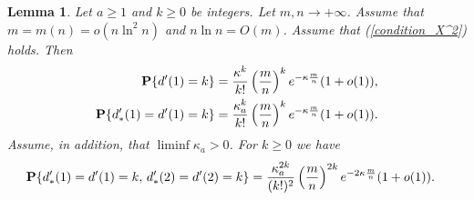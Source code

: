 \documentclass[11pt, a4paper]{article}
\newcommand{\PP}{{\bf{P}}}
\newtheorem{lem}{Lemma}
\begin{document}
\begin{lem}\label{AB+} 
Let $a\ge 1$ and $k\ge 0$ be integers.
Let $m,n\to+\infty$.
 Assume that $m=m(n)=o(n\ln^2n)$ and $n\ln n=O(m)$.  Assume that (\ref{condition_X^2}) holds. Then
 \begin{align}
  \label{2025-09-04}
 \PP\{d'(1)=k\}
 &
 =
 \frac{\kappa^k}{k!}\left(\frac{m}{n}\right)^k e^{-\kappa\frac{m}{n}}
 (1+o(1)),
 \\
 \label{2025-06-21_6+r+r}
 \PP\{d_*'(1)=d'(1)=k\}
 &
 =
 \frac{\kappa_a^k}{k!}
 \left(\frac{m}{n}\right)^k
  e^{-\kappa\frac{m}{n}}
 (1+o(1)).
 \end{align}
 Assume, in addition, that $\liminf\kappa_a>0$.
 For $k\ge 0$ we have 
 \begin{align}
  \label{2025-6-21_9+r}
 \PP\{d_*'(1)=d'(1)=k,\, d_*'(2)=d'(2)=k\}
& =\frac{\kappa_a^{2k}}{(k!)^2}
\left(\frac{m}{n}\right)^{2k}
 e^{-2\kappa\frac{m}{n}}
 (1+o(1)).
 \end{align}
\end{lem}
\end{document}
